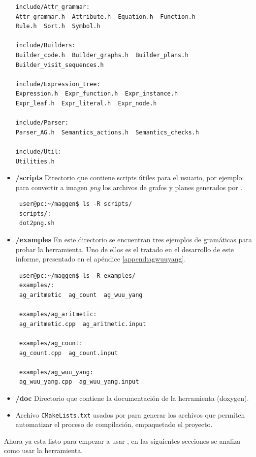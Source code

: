 \begin{itemize}
{\begin{verbatim}
include/Attr_grammar:
Attr_grammar.h  Attribute.h  Equation.h  Function.h  
Rule.h  Sort.h  Symbol.h

include/Builders:
Builder_code.h  Builder_graphs.h  Builder_plans.h  
Builder_visit_sequences.h

include/Expression_tree:
Expression.h  Expr_function.h  Expr_instance.h  
Expr_leaf.h  Expr_literal.h  Expr_node.h

include/Parser:
Parser_AG.h  Semantics_actions.h  Semantics_checks.h

include/Util:
Utilities.h
\end{verbatim}}

\item \textbf{/scripts} Directorio que contiene scripts útiles para el usuario, por ejemplo:  para convertir a imagen \textit{png} los archivos de grafos y planes generados por \maggen.
{\footnotesize \begin{verbatim}
 user@pc:~/maggen$ ls -R scripts/
 scripts/:
 dot2png.sh
\end{verbatim} }
 
\item \textbf{/examples} En este directorio se encuentran tres ejemplos de gramáticas para probar la herramienta. Uno de ellos es el tratado en el desarrollo de este informe, presentado en el apéndice \ref{append:agwuuyang}. 
{\footnotesize \begin{verbatim}
 user@pc:~/maggen$ ls -R examples/
 examples/:
 ag_aritmetic  ag_count  ag_wuu_yang

 examples/ag_aritmetic:
 ag_aritmetic.cpp  ag_aritmetic.input

 examples/ag_count:
 ag_count.cpp  ag_count.input

 examples/ag_wuu_yang:
 ag_wuu_yang.cpp  ag_wuu_yang.input
\end{verbatim} }

\item \textbf{/doc} Directorio que contiene la documentación de la herramienta (doxygen).
\item Archivo \texttt{CMakeLists.txt} usados por  para generar los archivos  que permiten automatizar el proceso de compilación, empaquetado el proyecto.
\end{itemize}

Ahora ya esta listo para empezar a usar \maggen, en las siguientes secciones se analiza como usar la herramienta.

